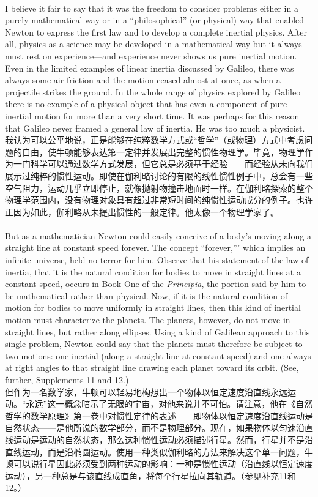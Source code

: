 \documentclass{article}
\begin{document}
\addtolength{\leftskip}{-1cm}

\\
I believe it fair to say that it was the freedom to consider problems either in a purely mathematical way or in a ``philosophical'' (or physical) way that enabled Newton to express the first law and to develop a complete inertial physics. After all, physics as a science may be developed in a mathematical way but it always must rest on experience—and experience never shows us pure inertial motion. Even in the limited examples of linear inertia discussed by Galileo, there was always some air friction and the motion ceased almost at once, as when a projectile strikes the ground. In the whole range of physics explored by Galileo there is no example of a physical object that has even a component of pure inertial motion for more than a very short time. It was perhaps for this reason that Galileo never framed a general law of inertia. He was too much a physicist.\\
我认为可以公平地说，正是能够在纯粹数学方式或“哲学”（或物理）方式中考虑问题的自由，使牛顿能够表达第一定律并发展出完整的惯性物理学。毕竟，物理学作为一门科学可以通过数学方式发展，但它总是必须基于经验——而经验从未向我们展示过纯粹的惯性运动。即使在伽利略讨论的有限的线性惯性例子中，总会有一些空气阻力，运动几乎立即停止，就像抛射物撞击地面时一样。在伽利略探索的整个物理学范围内，没有物理对象具有超过非常短时间的纯惯性运动成分的例子。也许正因为如此，伽利略从未提出惯性的一般定律。他太像一个物理学家了。\\

\\
But as a mathematician Newton could easily conceive of a body's moving along a straight line at constant speed forever. The concept ``forever,''' which implies an infinite universe, held no terror for him. Observe that his statement of the law of inertia, that it is the natural condition for bodies to move in straight lines at a constant speed, occurs in Book One of the \textit{Principia}, the portion said by him to be mathematical rather than physical. Now, if it is the natural condition of motion for bodies to move uniformly in straight lines, then this kind of inertial motion must characterize the planets. The planets, however, do not move in straight lines, but rather along ellipses. Using a kind of Galilean approach to this single problem, Newton could say that the planets must therefore be subject to two motions: one inertial (along a straight line at constant speed) and one always at right angles to that straight line drawing each planet toward its orbit. (See, further, Supplements 11 and 12.)\\
但作为一名数学家，牛顿可以轻易地构想出一个物体以恒定速度沿直线永远运动。“永远”这一概念暗示了无限的宇宙，对他来说并不可怕。请注意，他在《自然哲学的数学原理》第一卷中对惯性定律的表述——即物体以恒定速度沿直线运动是自然状态——是他所说的数学部分，而不是物理部分。现在，如果物体以匀速沿直线运动是运动的自然状态，那么这种惯性运动必须描述行星。然而，行星并不是沿直线运动，而是沿椭圆运动。使用一种类似伽利略的方法来解决这个单一问题，牛顿可以说行星因此必须受到两种运动的影响：一种是惯性运动（沿直线以恒定速度运动），另一种总是与该直线成直角，将每个行星拉向其轨道。（参见补充11和12。）\\
\end{document}
